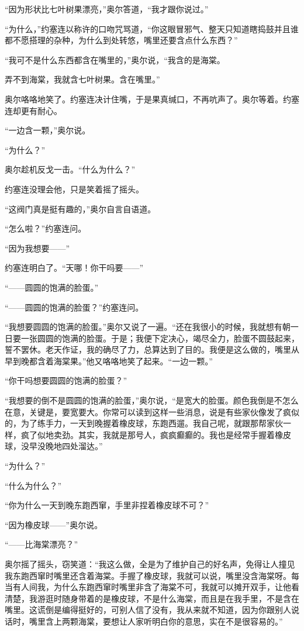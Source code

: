     “因为形状比七叶树果漂亮，”奥尔答道，“我才跟你说过。”

    “为什么，”约塞连以称许的口吻咒骂道，“你这眼冒邪气、整天只知道瞎捣鼓并且谁都不愿搭理的杂种，为什么到处转悠，嘴里还要含点什么东西？”

    “我可不是什么东西都含在嘴里的，”奥尔说，“我含的是海棠。

    弄不到海棠，我就含七叶树果。含在嘴里。”

    奥尔咯咯地笑了。约塞连决计住嘴，于是果真缄口，不再吭声了。奥尔等着。约塞连却更有耐心。

    “一边含一颗，”奥尔说。

    “为什么？”

    奥尔趁机反戈一击。“什么为什么？”

    约塞连没理会他，只是笑着摇了摇头。

    “这阀门真是挺有趣的，”奥尔自言自语道。

    “怎么啦？”约塞连问。

    “因为我想要——”

    约塞连明白了。“天哪！你干吗要——”

    “——圆圆的饱满的脸蛋。”

    “——圆圆的饱满的脸蛋？”约塞连问。

    “我想要圆圆的饱满的脸蛋。”奥尔又说了一遍。“还在我很小的时候，我就想有朝一日要一张圆圆的饱满的脸蛋。于是；我便下定决心，竭尽全力，脸蛋不圆鼓起来，誓不罢休。老天作证，我的确尽了力，总算达到了目的。我便是这么做的，嘴里从早到晚都含着海棠果。”他又咯咯地笑了起来。“一边一颗。”

    “你干吗想要圆圆的饱满的脸蛋？”

    “我想要的倒不是圆圆的饱满的脸蛋，”奥尔说，“是宽大的脸蛋。颜色我倒是不怎么在意，关键是，要宽要大。你常可以读到这样一些消息，说是有些家伙像发了疯似的，为了练手力，一天到晚握着橡皮球，东跑西遛。我自己呢，就跟那帮家伙一样，疯了似地卖劲。其实，我就是那号人，疯疯癫癫的。我也是经常手握着橡皮球，没早没晚地四处溜达。”

    “为什么？”

    “什么为什么？”

    “你为什么一天到晚东跑西窜，手里非捏着橡皮球不可？”

    “因为橡皮球——”奥尔说。

    “——比海棠漂亮？”

    奥尔摇了摇头，窃笑道：“我这么做，全是为了维护自己的好名声，免得让人撞见我东跑西窜时嘴里还含着海棠。手握了橡皮球，我就可以说，嘴里没含海棠呀。每当有人间我，为什么东跑西窜时嘴里非含了海棠不可，我就可以摊开双手，让他看清楚，我游逛时随身带着的是橡皮球，不是什么海棠，而且是在我手里，不是含在嘴里。这谎倒是编得挺好的，可别人信了没有，我从来就不知道，因为你跟别人说话时，嘴里含上两颗海棠，要想让人家听明白你的意思，实在不是很容易的。”


